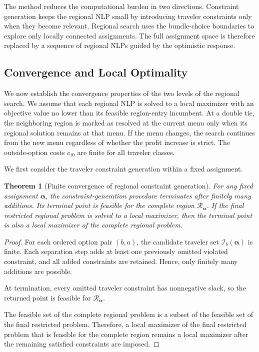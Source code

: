 \documentclass{article}
\newtheorem{theorem}{Theorem}
\begin{document}
The method reduces the computational burden in two directions.
Constraint generation keeps the regional NLP small by introducing
traveler constraints only when they become relevant. Regional search
uses the bundle-choice boundaries to explore only locally connected
assignments. The full assignment space is therefore replaced by a
sequence of regional NLPs guided by the optimistic response.

\subsection{Convergence and Local Optimality}

We now establish the convergence properties of the two levels of the
regional search. We assume that each regional NLP is solved to a local
maximizer with an objective value no lower than its feasible region-entry
incumbent. At a double tie, the neighboring region is marked as resolved
at the current menu only when its regional solution remains at that menu.
If the menu changes, the search continues from the new menu regardless
of whether the profit increase is strict. The outside-option costs
$e_{i0}$ are finite for all traveler classes.

We first consider the traveler constraint generation within a fixed
assignment.

\begin{theorem}[Finite convergence of regional constraint generation]
For any fixed assignment $\bm\alpha$, the constraint-generation
procedure terminates after finitely many additions. Its terminal point
is feasible for the complete region $\mathcal R_{\bm\alpha}$. If the
final restricted regional problem is solved to a local maximizer, then
the terminal point is also a local maximizer of the complete regional
problem.
\label{thm:inner-convergence}
\end{theorem}

\begin{proof}
For each ordered option pair $(b,a)$, the candidate traveler set
$\mathcal I_b(\bm\alpha)$ is finite. Each separation step adds at least
one previously omitted violated constraint, and all added constraints
are retained. Hence, only finitely many additions are possible.

At termination, every omitted traveler constraint has nonnegative slack,
so the returned point is feasible for $\mathcal R_{\bm\alpha}$.

The feasible set of the complete regional problem is a subset of the
feasible set of the final restricted problem. Therefore, a local
maximizer of the final restricted problem that is feasible for the
complete region remains a local maximizer after the remaining satisfied
constraints are imposed.
\end{proof}
\end{document}
